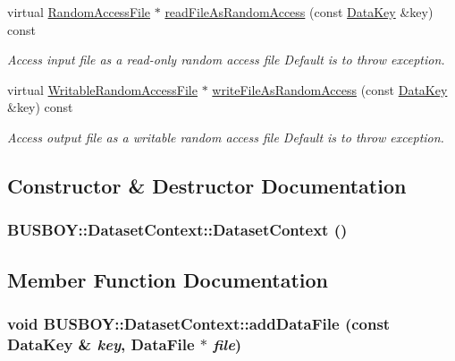 \begin{DoxyCompactItemize}
virtual \hyperlink{classBUSBOY_1_1RandomAccessFile}{RandomAccessFile} $\ast$ \hyperlink{classBUSBOY_1_1DatasetContext_a371cee56375e6052f1626a525bc35a61}{readFileAsRandomAccess} (const \hyperlink{classBUSBOY_1_1DataKey}{DataKey} \&key) const 
\begin{DoxyCompactList}\small\item\em Access input file as a read-\/only random access file Default is to throw exception. \item\end{DoxyCompactList}\item 
virtual \hyperlink{classBUSBOY_1_1WritableRandomAccessFile}{WritableRandomAccessFile} $\ast$ \hyperlink{classBUSBOY_1_1DatasetContext_a9137476c998215cdd6e1434c4325c154}{writeFileAsRandomAccess} (const \hyperlink{classBUSBOY_1_1DataKey}{DataKey} \&key) const 
\begin{DoxyCompactList}\small\item\em Access output file as a writable random access file Default is to throw exception. \item\end{DoxyCompactList}\end{DoxyCompactItemize}


\subsection{Constructor \& Destructor Documentation}
\hypertarget{classBUSBOY_1_1DatasetContext_a933c6f2a96c8ed5c9219b1a6dcc3618d}{
\subsubsection[{DatasetContext}]{\setlength{\rightskip}{0pt plus 5cm}BUSBOY::DatasetContext::DatasetContext ()}}
\label{classBUSBOY_1_1DatasetContext_a933c6f2a96c8ed5c9219b1a6dcc3618d}


\subsection{Member Function Documentation}
\hypertarget{classBUSBOY_1_1DatasetContext_a76ffe901522f6cfc86a09ed3e5087abb}{
\subsubsection[{addDataFile}]{\setlength{\rightskip}{0pt plus 5cm}void BUSBOY::DatasetContext::addDataFile (const {\bf DataKey} \& {\em key}, \/  {\bf DataFile} $\ast$ {\em file})}}
\label{classBUSBOY_1_1DatasetContext_a76ffe901522f6cfc86a09ed3e5087abb}


